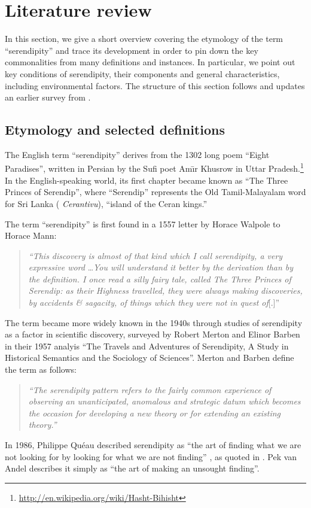 \section{Literature review} \label{sec:literature-review}

In this section, we give a short overview covering the etymology of
the term ``serendipity'' and trace its development in order to pin
down the key commonalities from many definitions and instances.  In
particular, we point out key conditions of serendipity, their
components and general characteristics, including environmental
factors.  The structure of this section follows and updates an earlier
survey from .

\subsection{Etymology and selected definitions} \label{sec:overview-serendipity}
The English term ``serendipity'' derives from the 1302 long poem ``Eight Paradises'', written in Persian by the Sufi poet Am\={\i}r Khusrow in Uttar Pradesh.\footnote{\url{http://en.wikipedia.org/wiki/Hasht-Bihisht}}  In the English-speaking world, its first chapter became known as ``The Three Princes of Serendip'', where ``Serendip'' represents the Old Tamil-Malayalam word for Sri Lanka (%
\emph{Cerantivu}), ``island of the Ceran kings.''

The term ``serendipity'' is first found in a 1557 letter by Horace Walpole to Horace Mann:
\begin{quote}
\emph{``This discovery is almost of that kind which I call serendipity, a very expressive
word} \ldots \emph{You will understand it better by the derivation than by the
definition. I once read a silly fairy tale, called The Three Princes of Serendip:
as their Highness travelled, they were always making discoveries, by accidents
\& sagacity, of things which they were not in quest of}[.]''~\cite[p. 633]{van1994anatomy}
\end{quote}
The term became more widely known in the 1940s through studies of serendipity as a factor in scientific discovery, surveyed by Robert Merton and Elinor Barben \citeyear{merton} in their 1957 analyis ``The Travels and Adventures of Serendipity, A Study in Historical Semantics and the Sociology of Sciences''.  Merton and Barben define the term as follows:
\begin{quote}
\emph{``The serendipity pattern refers to the fairly common experience of observing
an unanticipated, anomalous and strategic datum which becomes the occasion
for developing a new theory or for extending an existing theory.''} \cite[p. 635]{van1994anatomy}
\end{quote}
In 1986, Philippe Qu\'eau described serendipity as ``the art of
finding what we are not looking for by looking for what we are not
finding'' \cite{eloge-de-la-simulation}, as quoted in
\cite[p. 121]{Campos2002}.  Pek van Andel
\citeyear[p. 631]{van1994anatomy} describes it simply as ``the art of
making an unsought finding''.

